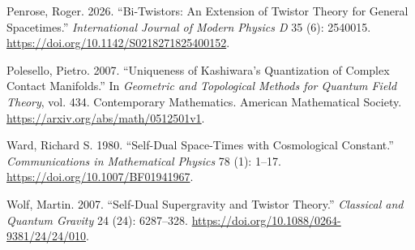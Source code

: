 \documentclass[
  english,
  11pt,
  reqno]{amsart}
\newlength{\cslhangindent}
\newenvironment{CSLReferences}[2] %
 {\begin{list}{}{%
  \setlength{\itemindent}{0pt}
  \setlength{\leftmargin}{0pt}
  \setlength{\parsep}{0pt}
  \ifodd #1
   \setlength{\leftmargin}{\cslhangindent}
   \setlength{\itemindent}{-1\cslhangindent}
  \fi
  \setlength{\itemsep}{#2\baselineskip}}}
 {\end{list}}
\begin{document}
\begin{CSLReferences}{1}{1}
Penrose, Roger. 2026. {``Bi-Twistors: An Extension of Twistor Theory for
General Spacetimes.''} \emph{International Journal of Modern Physics D}
35 (6): 2540015. \url{https://doi.org/10.1142/S0218271825400152}.

Polesello, Pietro. 2007. {``Uniqueness of {Kashiwara}'s Quantization of
Complex Contact Manifolds.''} In \emph{Geometric and Topological Methods
for Quantum Field Theory}, vol. 434. Contemporary Mathematics. American
Mathematical Society. \url{https://arxiv.org/abs/math/0512501v1}.

Ward, Richard S. 1980. {``Self-Dual Space-Times with Cosmological
Constant.''} \emph{Communications in Mathematical Physics} 78 (1):
1--17. \url{https://doi.org/10.1007/BF01941967}.

Wolf, Martin. 2007. {``Self-Dual Supergravity and Twistor Theory.''}
\emph{Classical and Quantum Gravity} 24 (24): 6287--328.
\url{https://doi.org/10.1088/0264-9381/24/24/010}.

\end{CSLReferences}
\end{document}
